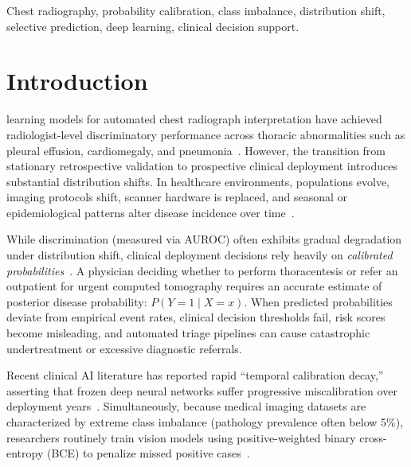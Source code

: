 \documentclass[journal]{IEEEtran}
\begin{document}
\begin{IEEEkeywords}
Chest radiography, probability calibration, class imbalance, distribution shift, selective prediction, deep learning, clinical decision support.
\end{IEEEkeywords}

\section{Introduction}
 learning models for automated chest radiograph interpretation have achieved radiologist-level discriminatory performance across thoracic abnormalities such as pleural effusion, cardiomegaly, and pneumonia~\cite{rajpurkar2017chexnet, reis2022brax}. However, the transition from stationary retrospective validation to prospective clinical deployment introduces substantial distribution shifts. In healthcare environments, populations evolve, imaging protocols shift, scanner hardware is replaced, and seasonal or epidemiological patterns alter disease incidence over time~\cite{finlayson2021clinician, kore2024empirical, shenouda2023assessment}.

While discrimination (measured via AUROC) often exhibits gradual degradation under distribution shift, clinical deployment decisions rely heavily on \textit{calibrated probabilities}~\cite{vancalster2019calibration, steyerberg2010assessing}. A physician deciding whether to perform thoracentesis or refer an outpatient for urgent computed tomography requires an accurate estimate of posterior disease probability: $P(Y = 1 \mid X = x)$. When predicted probabilities deviate from empirical event rates, clinical decision thresholds fail, risk scores become misleading, and automated triage pipelines can cause catastrophic undertreatment or excessive diagnostic referrals.

Recent clinical AI literature has reported rapid ``temporal calibration decay,'' asserting that frozen deep neural networks suffer progressive miscalibration over deployment years~\cite{guo2022evaluation, hinson2022multisite}. Simultaneously, because medical imaging datasets are characterized by extreme class imbalance (pathology prevalence often below 5\%), researchers routinely train vision models using positive-weighted binary cross-entropy (BCE) to penalize missed positive cases~\cite{rajpurkar2017chexnet, buda2018systematic}. 
\end{document}
